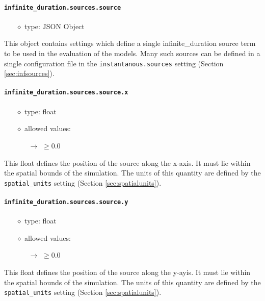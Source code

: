 \documentclass[]{article}
\def\code#1{\texttt{#1}}
\begin{document}
\paragraph{\code{infinite\_duration.sources.source}}\label{sec:infsource}
\begin{itemize}
    \item[$\diamond$] type: JSON Object 
\end{itemize}
This object contains settings which define a single infinite\_duration source term to
be used in the evaluation of the models. Many such sources can be defined in a
single configuration file in the \code{instantanous.sources} setting (Section
\ref{sec:infsources}).

\paragraph{\code{infinite\_duration.sources.source.x}}\label{sec:infsourcex}
\begin{itemize}
    \item[$\diamond$] type: float 
    \item[$\diamond$] allowed values:
    \begin{itemize}
        \item[$\rightarrow$] $\geq0.0$
    \end{itemize}
\end{itemize}
This float defines the position of the source along the x-axis. It must lie
within the spatial bounds of the simulation. The units of this quantity are
defined by the \code{spatial\_units} setting (Section \ref{sec:spatialunits}).

\paragraph{\code{infinite\_duration.sources.source.y}}\label{sec:infsourcey}
\begin{itemize}
    \item[$\diamond$] type: float 
    \item[$\diamond$] allowed values:
    \begin{itemize}
        \item[$\rightarrow$] $\geq0.0$
    \end{itemize}
\end{itemize}
This float defines the position of the source along the y-ayis. It must lie
within the spatial bounds of the simulation. The units of this quantity are
defined by the \code{spatial\_units} setting (Section \ref{sec:spatialunits}).
\end{document}
